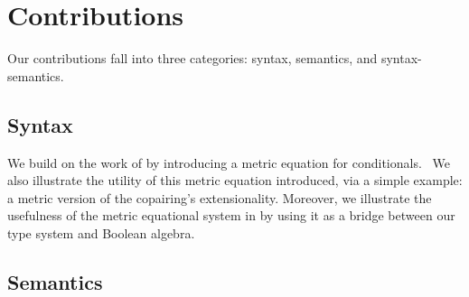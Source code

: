 






\section{Contributions}

Our contributions fall into three categories: syntax, semantics, and  syntax-semantics.

\subsection*{Syntax}

We build on the work of \cite{dahlqvist2023syntactic} by introducing a metric equation for conditionals.  We also illustrate the utility of this metric equation introduced, via a simple example: a metric version of the copairing's extensionality. 
Moreover, we illustrate the usefulness of the metric equational system in \cite{dahlqvist2023syntactic} by using it as a bridge between our type system and Boolean algebra.


\subsection*{Semantics}

